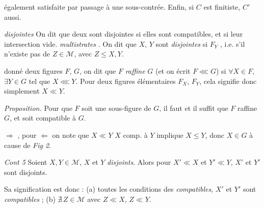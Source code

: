 \documentclass[11pt,a4paper]{article}
\begin{document}
également satisfaite par passage à une sous-contrée. Enfin, si $C$ est finitiste, $C'$ aussi.

\emph{ disjointes} \quad On dit que deux \ill{} sont disjointes si elles sont compatibles, et si leur intersection \ill{} vide.
\ill{} \emph{multistrates} \ill{}. On dit que $X$, $Y$ sont \emph{disjointes} si \struck{\ill{}} \ill{} $F_Y$ \ill{}, i.e. s'il n'existe pas de \struck{\ill{}} $Z \in \mathcal{M}$, avec $Z \leq X, Y$.

\struck{\ill{}} donné deux figures $F$, $G$, on dit que $F$ \emph{raffine} $G$ (et on écrit $F \lll G$) si $\forall X \in F$, $\exists Y \in G$ tel que $X \lll Y$. Pour deux figures élémentaires $F_X$, $F_Y$, cela signifie donc simplement $X \ll Y$.


\emph{Proposition.} Pour que $F$ soit une sous-figure de $G$, il faut et il suffit que $F$ raffine $G$, et soit compatible à $G$.

\ill{} $\Rightarrow$ , pour $\Leftarrow$ on note que $X \ll Y$  $X$ comp. à $Y$ \struck{\ill{}} implique $X \leq Y$, donc $X \in G$ à cause de \emph{Fig 2}.

\emph{Cont 5} \quad Soient $X, Y \in \mathcal{M}$, $X$ et $Y$ \emph{disjoints}. Alors pour $X' \ll X$ et $Y' \ll Y$, $X'$ et $Y'$ sont   disjoints.


Sa signification est donc : \struck{\ill{}} (a) toutes les conditions des  \emph{compatibles}, $X'$ et $Y'$ sont \emph{compatibles} ; (b) \struck{\ill{}} $\nexists\, Z \in \mathcal{M}$ avec $Z \ll X$, $Z \ll Y$.
\end{document}
